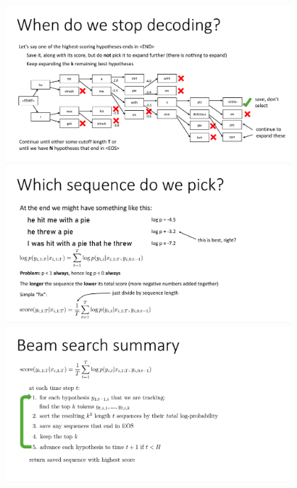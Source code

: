 \documentclass{book}
\begin{document}
\begin{figure}[H]
    \centering
    \includegraphics[width=0.95\textwidth]{images/lec11_12.png}
    \includegraphics[width=0.95\textwidth]{images/lec11_13.png}
    \includegraphics[width=0.95\textwidth]{images/lec11_14.png}
\end{figure}
\end{document}
